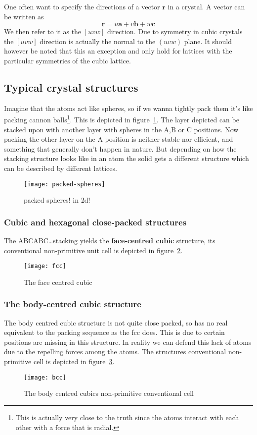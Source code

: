 \documentclass[11pt]{article}
\begin{document}
One often want to specify the directions of a vector $\mathbf{r}$ in a crystal. A vector can be written as 
\begin{equation}
	\mathbf{r} = u\mathbf{a} + v \mathbf{b} + w \mathbf{c}
\end{equation}
We then refer to it as the $[uvw]$ direction. Due to symmetry in cubic crystals the $[uvw]$ direction is actually the normal to the $(uvw)$ plane. It should however be noted that this an exception and only hold for lattices with the particular symmetries of the cubic lattice.

\newpage
\subsection{Typical crystal structures}
Imagine that the atoms act like spheres, so if we wanna tightly pack them it's like packing cannon balls\footnote{This is actually very close to the truth since the atoms interact with each other with a force that is radial.}. This is depicted in figure~\ref{fig:packed-spheres}. The layer depicted can be stacked upon with another layer with spheres in the A,B or C positions. Now packing the other layer on the A position is neither stable nor efficient, and something that generally don't happen in nature. But depending on how the stacking structure looks like in an atom the solid gets a different structure which can be described by different lattices. 
\begin{figure}[H]
	\centering
	\texttt{[image: packed-spheres]}
	\caption{packed spheres! in 2d!}
	\label{fig:packed-spheres}
\end{figure}
\subsubsection{Cubic and hexagonal close-packed structures}
The ABCABC\ldots stacking yields the \textbf{face-centred cubic} structure, its conventional non-primitive unit cell is depicted in figure~\ref{fig:fcc}.
\begin{figure}[H]
	\centering
	\texttt{[image: fcc]}
	\caption{The face centred cubic}
	\label{fig:fcc}
\end{figure}
\subsubsection{The body-centred cubic structure}
The body centred cubic structure is not quite close packed, so has no real equivalent to the packing sequence as the fcc does. This is due to certain positions are missing in this structure. In reality we can defend this lack of atoms due to the repelling forces among the atoms. The structures conventional non-primitive cell is depicted in figure~\ref{fig:bcc}.
\begin{figure}[H]
	\centering
	\texttt{[image: bcc]}
	\caption{The body centred cubics non-primitive conventional cell}
	\label{fig:bcc}
\end{figure}
\end{document}
